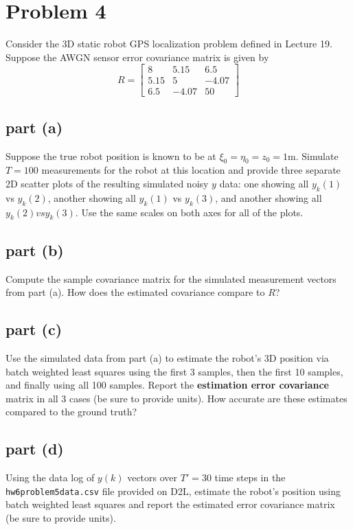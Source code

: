 \documentclass[11pt]{article}
\begin{document}
\section*{Problem 4}
Consider the 3D static robot GPS localization problem defined in Lecture 19. Suppose the AWGN sensor error covariance matrix is given by 
\begin{equation*}
	R=\begin{bmatrix} 8 & 5.15 & 6.5 \\ 5.15 & 5 & -4.07 \\ 6.5 & -4.07 & 50 \end{bmatrix}
\end{equation*}

\subsection*{part (a)}
Suppose the true robot position is known to be at $\xi_0=\eta_0=z_0=1\text{m}$. Simulate $T=100$ measurements for the robot at this location and provide three separate 2D scatter plots of the resulting simulated noisy $y$ data: one showing all $y_k(1)$ vs $y_k(2)$, another showing all $y_k(1)$ vs $y_k(3)$, and another showing all $y_k(2) vs y_k(3)$. Use the same scales on both axes for all of the plots.

\subsection*{part (b)}
Compute the sample covariance matrix for the simulated measurement vectors from part (a). How does the estimated covariance compare to $R$?

\subsection*{part (c)}
Use the simulated data from part (a) to estimate the robot's 3D position via batch weighted least squares using the first 3 samples, then the first 10 samples, and finally using all 100 samples. Report the \textbf{estimation error covariance} matrix in all 3 cases (be sure to provide units). How accurate are these estimates compared to the ground truth?

\subsection*{part (d)}
Using the data log of $y(k)$ vectors over $T'=30$ time steps in the \texttt{hw6problem5data.csv} file provided on D2L, estimate the robot's position using batch weighted least squares and report the estimated error covariance matrix (be sure to provide units).
\end{document}
